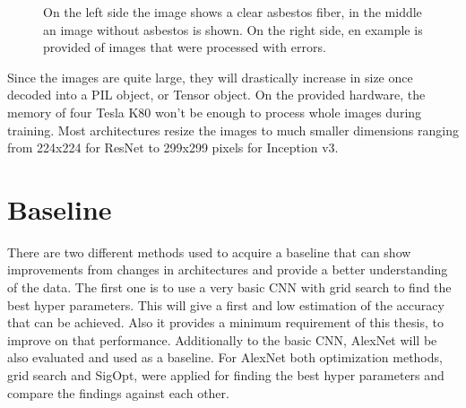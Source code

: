 \begin{figure}[t]
\centering
\caption{On the left side the image shows a clear asbestos fiber, in the middle an image without asbestos is shown. On the right side, en example is provided of images that were processed with errors.}
\label{fig:basic_examples}
\end{figure}

\newpage

Since the images are quite large, they will drastically increase in size once decoded into a PIL object, or Tensor object. On the provided hardware, the memory of four Tesla K80 won't be enough to process whole images during training. Most architectures resize the images to much smaller dimensions ranging from 224x224 for ResNet to 299x299 pixels for Inception v3.

\section{Baseline}

There are two different methods used to acquire a baseline that can show improvements from changes in architectures and provide a better understanding of the data. The first one is to use a very basic CNN with grid search to find the best hyper parameters. This will give a first and low estimation of the accuracy that can be achieved. Also it provides a minimum requirement of this thesis, to improve on that performance. Additionally to the basic CNN, AlexNet will be also evaluated and used as a baseline. For AlexNet both optimization methods, grid search and SigOpt, were applied for finding the best hyper parameters and compare the findings against each other.\\

